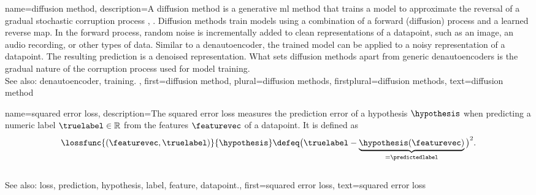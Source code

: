 {name={diffusion method},
	description={A diffusion method is a generative \gls{ml} method that
		trains a \gls{model} to approximate the reversal of a gradual \gls{stochastic}
		corruption process \cite{Prince2023UnderstandingDL}, \cite{BishopDeepLearning}. 
		Diffusion methods train \glspl{model} using a combination of a forward (diffusion) 
		process and a learned reverse \gls{map}.
		In the forward process, random noise is incrementally added to clean
		representations of a \gls{datapoint}, such as an image, an audio recording,
		or other types of \gls{data}. Similar to a \gls{denautoencoder}, the 
		trained \gls{model} can be applied to a noisy representation of a \gls{datapoint}. 
		The resulting \gls{prediction} is a denoised representation. What sets 
		diffusion methods apart from generic \glspl{denautoencoder} is the gradual 
		nature of the corruption process used for \gls{model} \gls{training}.
		\\
		See also: \gls{denautoencoder}, \gls{training}. },
	first={diffusion method},
    	plural={diffusion methods},
    	firstplural={diffusion methods},
    	text={diffusion method}
}

{name={squared error loss},
	description={The squared 
		error \gls{loss} measures the \gls{prediction} error of a 
		\gls{hypothesis} $\hypothesis$ when predicting a numeric \gls{label} $\truelabel \in \mathbb{R}$ 
		from the \glspl{feature} $\featurevec$ of a \gls{datapoint}. It is defined as 
		\begin{equation} 
			\nonumber
			\lossfunc{(\featurevec,\truelabel)}{\hypothesis} \defeq \big(\truelabel - \underbrace{\hypothesis(\featurevec)}_{=\predictedlabel} \big)^{2}. 
		\end{equation} 
			\\ 
		See also: \gls{loss}, \gls{prediction}, \gls{hypothesis}, \gls{label}, \gls{feature}, \gls{datapoint}.},
	first={squared error loss},
	text={squared error loss}
}

